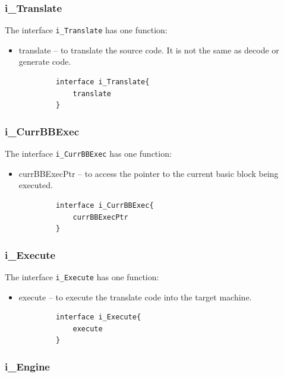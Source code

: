 \documentclass{report}
\begin{document}
			\subsubsection*{i\_Translate}
			
			\par The interface \texttt{i\_Translate} has one function:
			\begin{itemize}
				\item translate -- to translate the source code. It is not the same as decode or generate code.
			\end{itemize}
			
			\begin{lstlisting}
			interface i_Translate{
				translate 
			}
			\end{lstlisting}

			\subsubsection*{i\_CurrBBExec}
			
			\par The interface \texttt{i\_CurrBBExec} has one function:
			\begin{itemize}
				\item currBBExecPtr -- to access the pointer to the current basic block being executed.
			\end{itemize}
			
			\begin{lstlisting}
			interface i_CurrBBExec{
				currBBExecPtr
			}
			\end{lstlisting}
			
			\subsubsection*{i\_Execute}
			
			\par The interface \texttt{i\_Execute} has one function:
			\begin{itemize}
				\item execute -- to execute the translate code into the target machine.
			\end{itemize}
			
			\begin{lstlisting}
			interface i_Execute{
				execute
			}
			\end{lstlisting}
			
			\subsubsection*{i\_Engine}
			
\end{document}
